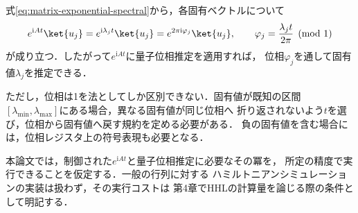 式\eqref{eq:matrix-exponential-spectral}から，各固有ベクトルについて
\begin{equation}
 e^{\mathrm{i}At}\ket{u_j}
 =e^{\mathrm{i}\lambda_jt}\ket{u_j}
 =e^{2\pi\mathrm{i}\varphi_j}\ket{u_j},
 \qquad
 \varphi_j=\frac{\lambda_jt}{2\pi}\pmod 1
 \label{eq:matrix-eigenvalue-to-phase}
\end{equation}
が成り立つ．したがって$e^{\mathrm{i}At}$に量子位相推定を適用すれば，
位相$\varphi_j$を通して固有値$\lambda_j$を推定できる．

ただし，位相は1を法としてしか区別できない．固有値が既知の区間
$[\lambda_{\min},\lambda_{\max}]$にある場合，異なる固有値が同じ位相へ
折り返されないよう$t$を選び，位相から固有値へ戻す規約を定める必要がある．
負の固有値を含む場合には，位相レジスタ上の符号表現も必要となる．

本論文では，制御された$e^{\mathrm{i}At}$と量子位相推定に必要なその冪を，
所定の精度で実行できることを仮定する．一般の行列に対する
ハミルトニアンシミュレーションの実装は扱わず，その実行コストは
第4章でHHLの計算量を論じる際の条件として明記する．
